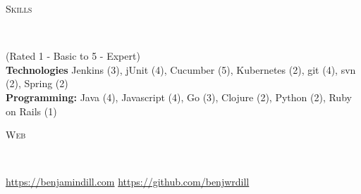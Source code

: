 \documentclass[9pt]{article}
\newenvironment{changemargin}[2]{%
  \begin{list}{}{%
      \setlength{\topsep}{0pt}%
      \setlength{\leftmargin}{#1}%
      \setlength{\rightmargin}{#2}%
      \setlength{\listparindent}{\parindent}%
      \setlength{\itemindent}{\parindent}%
      \setlength{\parsep}{\parskip}%
    }%
  \item[]}{\end{list}
}
\newcommand{\lineover}{
  \begin{changemargin}{-0.05in}{-0.05in}
    \vspace*{-8pt}
    \hrulefill \\
    \vspace*{-2pt}
  \end{changemargin}
}
\newcommand{\header}[1]{
  \begin{changemargin}{-0.5in}{-0.5in}
    \scshape{#1}\\
    \lineover
  \end{changemargin}
}
\newcommand{\contact}[5]{
  \begin{changemargin}{-0.5in}{-0.5in}
    \begin{center}
      {\Large \scshape {#1}}\\ \smallskip
      {#2}\\ \smallskip 
      {#3}\\ \smallskip
      {#4}\\ \smallskip
      {#5}\smallskip
    \end{center}
  \end{changemargin}
}
\newenvironment{body} {
  \vspace*{-16pt}
  \begin{changemargin}{-0.25in}{-0.5in}
  }	
  {\end{changemargin}
}
\newcommand{\school}[4]{
  \textbf{#1} \hfill \emph{#2\\}
  #3\\ 
  #4\\
}
\begin{document}
\newcommand{\header}[1]{
  \begin{changemargin}{-0.5in}{-0.5in}
    \scshape{#1}\\
    \lineover
  \end{changemargin}
}

\newcommand{\contact}[5]{
  \begin{changemargin}{-0.5in}{-0.5in}
    \begin{center}
      {\Large \scshape {#1}}\\ \smallskip
      {#2}\\ \smallskip 
      {#3}\\ \smallskip
      {#4}\\ \smallskip
      {#5}\smallskip
    \end{center}
  \end{changemargin}
}

\newenvironment{body} {
  \vspace*{-16pt}
  \begin{changemargin}{-0.25in}{-0.5in}
  }	
  {\end{changemargin}
}	

\newcommand{\school}[4]{
  \textbf{#1} \hfill \emph{#2\\}
  #3\\ 
  #4\\
}


\header{Skills}

\begin{body}
  \vspace{17pt}
  {(Rated 1 - Basic to 5 - Expert)} \\
  \textbf{Technologies} Jenkins (3), jUnit (4), Cucumber (5), Kubernetes (2), git (4), svn (2), Spring (2) \\
  \textbf{Programming:} Java (4), Javascript (4), Go (3), Clojure (2), Python (2), Ruby on Rails (1) \\
\end{body}

\smallskip

\header{Web}

\begin{body}
  \vspace{17pt}
  \url{https://benjamindill.com} \hfill{} \url{https://github.com/benjwrdill} \\
\end{body}
\end{document}
